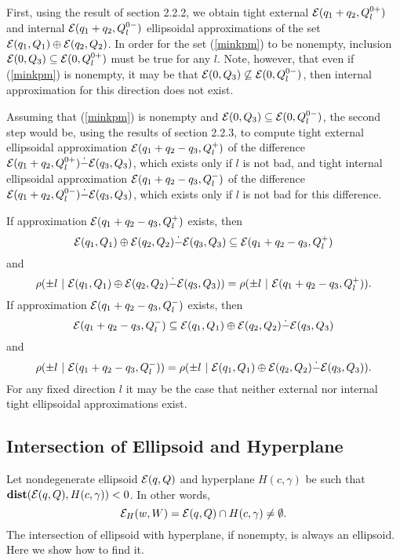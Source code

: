 First, using the result of section 2.2.2, we obtain tight external
$\EE(q_1+q_2,Q_l^{0+})$ and internal $\EE(q_1+q_2,Q_l^{0-})$ ellipsoidal
approximations of the set $\EE(q_1,Q_1)\oplus\EE(q_2,Q_2)$.
In order for the set (\ref{minkpm}) to be nonempty, inclusion
$\EE(0,Q_3)\subseteq\EE(0,Q_l^{0+})$ must be true for any $l$.
Note, however, that even if (\ref{minkpm}) is nonempty, it may be that
$\EE(0,Q_3)\not\subseteq\EE(0,Q_l^{0-})$, then internal approximation for this
direction does not exist.

Assuming that (\ref{minkpm}) is nonempty and
$\EE(0,Q_3)\subseteq\EE(0,Q_l^{0-})$, the second step would be, using the
results of section 2.2.3, to compute tight external ellipsoidal approximation
$\EE(q_1+q_2-q_3,Q_l^+)$ of the difference
$\EE(q_1+q_2,Q_l^{0+})\dot{-}\EE(q_3,Q_3)$, which exists only if $l$ is not
bad, and tight internal ellipsoidal approximation
$\EE(q_1+q_2-q_3,Q_l^-)$ of the difference
$\EE(q_1+q_2,Q_l^{0-})\dot{-}\EE(q_3,Q_3)$, which exists only if $l$ is not
bad for this difference.

If approximation $\EE(q_1+q_2-q_3,Q_l^+)$ exists, then
\[ \EE(q_1,Q_1)\oplus\EE(q_2,Q_2)\dot{-}\EE(q_3,Q_3) \subseteq
\EE(q_1+q_2-q_3,Q_l^+) \]
and
\[ \rho(\pm l ~|~ \EE(q_1,Q_1)\oplus\EE(q_2,Q_2)\dot{-}\EE(q_3,Q_3)) =
\rho(\pm l ~|~ \EE(q_1+q_2-q_3,Q_l^+)). \]
If approximation $\EE(q_1+q_2-q_3,Q_l^-)$ exists, then
\[ \EE(q_1+q_2-q_3,Q_l^-) \subseteq
\EE(q_1,Q_1)\oplus\EE(q_2,Q_2)\dot{-}\EE(q_3,Q_3) \]
and
\[ \rho(\pm l ~|~\EE(q_1+q_2-q_3,Q_l^-)) =
\rho(\pm l ~|~ \EE(q_1,Q_1)\oplus\EE(q_2,Q_2)\dot{-}\EE(q_3,Q_3)) . \]
For any fixed direction $l$ it may be the case that neither external nor
internal tight ellipsoidal approximations exist.












\subsection{Intersection of Ellipsoid and Hyperplane}
Let nondegenerate ellipsoid $\EE(q,Q)$ and hyperplane $H(c,\gamma)$ be such that
${\bf dist}(\EE(q,Q),H(c,\gamma))<0$. In other words,
\[ \EE_H(w,W) = \EE(q,Q)\cap H(c,\gamma) \neq \emptyset .\]
The intersection of ellipsoid with hyperplane, if nonempty, is always an
ellipsoid. Here we show how to find it.

